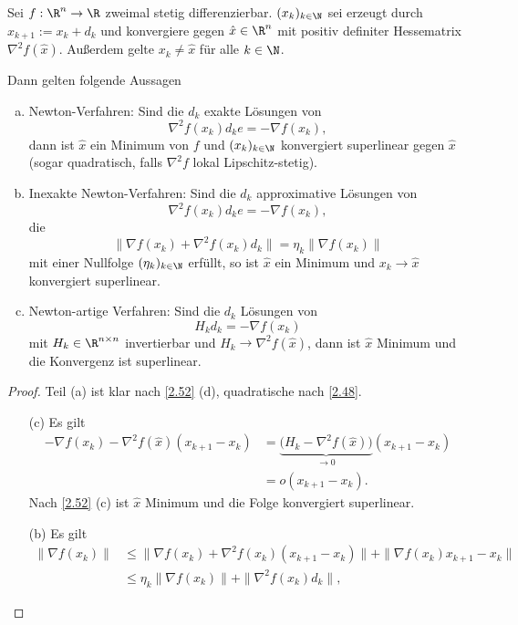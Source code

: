 \begin{st} \label{2.53}
	Sei $f: \R^n \to \R$ zweimal stetig differenzierbar.
	$(x_k)_{k\in\N}$ sei erzeugt durch $x_{k+1} := x_{k} + d_k$ und konvergiere gegen $\hat x \in \R^n$ mit positiv definiter Hessematrix $\nabla^2 f(\hat x)$.
	Außerdem gelte $x_k \neq \hat x$ für alle $k \in \N$.

	Dann gelten folgende Aussagen
	\begin{enumerate}[(a)]
		\item
			Newton-Verfahren:
			Sind die $d_k$ exakte Lösungen von
			\[
				\nabla^2 f(x_k) d_ke = - \nabla f(x_k),
			\]
			dann ist $\hat x$ ein Minimum von $f$ und $(x_k)_{k\in\N}$ konvergiert superlinear gegen $\hat x$ (sogar quadratisch, falls $\nabla^2 f$ lokal Lipschitz-stetig).
		\item
			Inexakte Newton-Verfahren:
			Sind die $d_k$ approximative Lösungen von
			\[
				\nabla^2 f(x_k) d_ke = - \nabla f(x_k),
			\]
			die
			\[
				\|\nabla f(x_k) + \nabla^2 f(x_k) d_k\| = \eta_k \|\nabla f(x_k)\|
			\]
			mit einer Nullfolge $(\eta_k)_{k\in\N}$ erfüllt, so ist $\hat x$ ein Minimum und $x_k \to \hat x$ konvergiert superlinear.
		\item
			Newton-artige Verfahren:
			Sind die $d_k$ Lösungen von
			\[
				H_k d_k = - \nabla f(x_k)
			\]
			mit $H_k \in \R^{n\times n}$ invertierbar und $H_k \to \nabla^2 f(\hat x)$, dann ist $\hat x$ Minimum und die Konvergenz ist superlinear.
	\end{enumerate}
	\begin{proof}
		Teil (a) ist klar nach \ref{2.52} (d), quadratische nach \ref{2.48}.
		\begin{enumerate}[(a)]
			\item[(c)]
				Es gilt
				\begin{align*}
					- \nabla f(x_k) - \nabla^2 f(\hat x) (x_{k+1} - x_k)
					&= \underbrace{\big(H_k - \nabla^2 f(\hat x)\big)}_{\to 0} (x_{k+1} - x_k) \\
					&= o(x_{k+1} - x_k).
				\end{align*}
				Nach \ref{2.52} (c) ist $\hat x$ Minimum und die Folge konvergiert superlinear.
			\item[(b)]
				Es gilt
				\begin{align*}
					\|\nabla f(x_k)\|
					&\le \|\nabla f(x_k) + \nabla^2 f(x_k) (x_{k+1} - x_k)\| + \| \nabla f(x_k){x_{k+1} - x_k} \| \\
					&\le \eta_k \|\nabla f(x_k)\| + \| \nabla^2 f(x_k) d_k \|,
				\end{align*}

\end{enumerate}
\end{proof}
\end{st}
